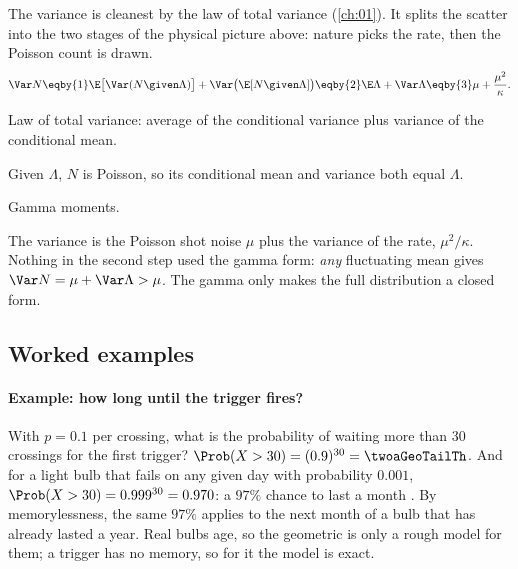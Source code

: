 The variance is cleanest by the law of total variance (\cref{ch:01}). It splits the scatter into the two stages of the physical picture above: nature picks the rate, then the Poisson count is drawn.
\begin{align}
  \Var N \eqby{1} \E\bigl[\Var(N\given\Lambda)\bigr]+\Var\bigl(\E[N\given\Lambda]\bigr) \eqby{2} \E\Lambda+\Var\Lambda \eqby{3} \mu+\frac{\mu^2}{\kappa}. \label{2a:eq:overdisp}
\end{align}
\begin{explain}
  \item Law of total variance: average of the conditional variance plus variance of the conditional mean.
  \item Given $\Lambda$, $N$ is Poisson, so its conditional mean and variance both equal $\Lambda$.
  \item Gamma moments.
\end{explain}
The variance is the Poisson shot noise $\mu$ plus the variance of the rate, $\mu^2/\kappa$. Nothing in the second step used the gamma form: \emph{any} fluctuating mean gives $\Var N=\mu+\Var\Lambda>\mu$. The gamma only makes the full distribution a closed form.

\subsection{Worked examples}

\paragraph{Example: how long until the trigger fires?}
With $p=0.1$ per crossing, what is the probability of waiting more than $30$ crossings for the first trigger? $\Prob(X>30)=(0.9)^{30}=\twoaGeoTailTh$. And for a light bulb that fails on any given day with probability $0.001$, $\Prob(X>30)=0.999^{30}=0.970$: a $97\%$ chance to last a month . By memorylessness, the same $97\%$ applies to the next month of a bulb that has already lasted a year. Real bulbs age, so the geometric is only a rough model for them; a trigger has no memory, so for it the model is exact.

